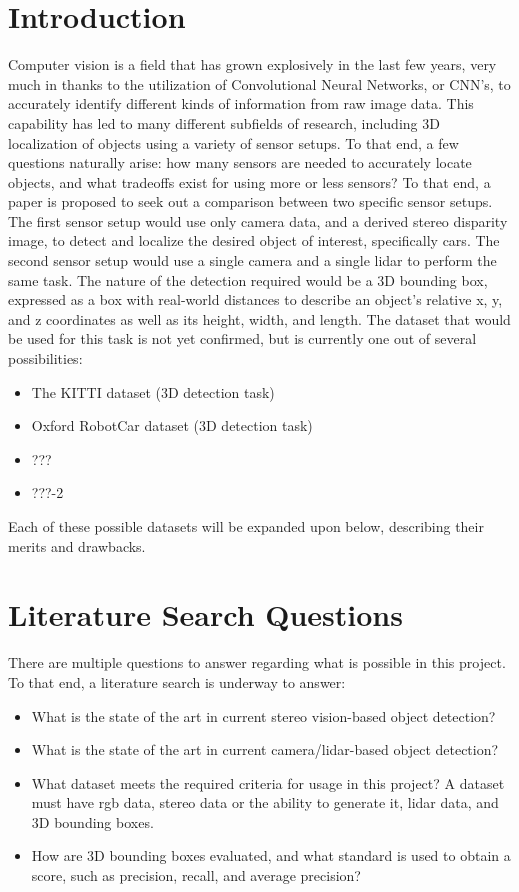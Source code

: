 \section{Introduction}
Computer vision is a field that has grown explosively in the last few years, very much in thanks to the utilization of Convolutional Neural Networks, or CNN's, to accurately identify different kinds of information from raw image data. This capability has led to many different subfields of research, including 3D localization of objects using a variety of sensor setups. To that end, a few questions naturally arise: how many sensors are needed to accurately locate objects, and what tradeoffs exist for using more or less sensors? To that end, a paper is proposed to seek out a comparison between two specific sensor setups. The first sensor setup would use only camera data, and a derived stereo disparity image, to detect and localize the desired object of interest, specifically cars. The second sensor setup would use a single camera and a single lidar to perform the same task. The nature of the detection required would be a 3D bounding box, expressed as a box with real-world distances to describe an object's relative x, y, and z coordinates as well as its height, width, and length. The dataset that would be used for this task is not yet confirmed, but is currently one out of several possibilities: 

\begin{itemize} \itemsep=-0.5em
\item The KITTI dataset (3D detection task)
\item Oxford RobotCar dataset (3D detection task)
\item ???
\item ???-2
\end{itemize}
Each of these possible datasets will be expanded upon below, describing their merits and drawbacks. 


\section{Literature Search Questions}
There are multiple questions to answer regarding what is possible in this project. To that end, a literature search is underway to answer: 

\begin{itemize} \itemsep=-0.5em
\item What is the state of the art in current stereo vision-based object detection? 
\item What is the state of the art in current camera/lidar-based object detection?
\item What dataset meets the required criteria for usage in this project? A dataset must have rgb data, stereo data or the ability to generate it, lidar data, and 3D bounding boxes.
\item How are 3D bounding boxes evaluated, and what standard is used to obtain a score, such as precision, recall, and average precision?
\end{itemize}

